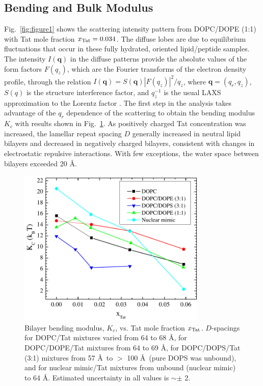 \subsection{Bending and Bulk Modulus}\label{sec:Kc_results}
Fig.~\ref{fig:figure1} shows the scattering intensity pattern from 
DOPC/DOPE (1:1) with Tat mole fraction $x_\textrm{Tat}=0.034$. The diffuse lobes are 
due to equilibrium fluctuations that occur in these fully hydrated, oriented 
lipid/peptide samples. The intensity $I(\mathbf{q})$ in the diffuse 
patterns provide the absolute values of the form factors $F(q_z)$, which are 
the Fourier transforms of the electron density 
profile, through the relation $I(\mathbf{q})=S(\mathbf{q})|F(q_z)|^2/q_z$, 
where $\mathbf{q}=(q_r,q_z)$, $S(q)$ is 
the structure
interference factor, and $q_z^{−1}$ is the usual LAXS approximation to the 
Lorentz factor \cite{Kucerka05_BPJ,Kucerka06,Kucerka05_JMB}.
The first step in the analysis takes advantage of the $q_r$ dependence of the 
scattering to obtain the
bending modulus $K_c$ with results shown in Fig.~\ref{fig:figure2}. 
As positively charged Tat concentration was increased, 
the lamellar repeat spacing $D$ generally increased in neutral lipid 
bilayers and decreased in negatively charged bilayers, consistent with changes in 
electrostatic repulsive interactions. 
With few exceptions, the water space between bilayers exceeded 20 \AA.

\begin{figure}[htbp]
  \centering
  \includegraphics[width=0.8\textwidth]{figures/Tat/NFIT_results/Kc}
  \caption{Bilayer bending modulus, $K_c$, vs. Tat mole fraction $x_\textrm{Tat}$. 
  $D$-spacings for DOPC/Tat mixtures varied from 64 to 68 \AA, 
  for DOPC/DOPE/Tat mixtures from 64 to 69 \AA, 
  for DOPC/DOPS/Tat (3:1) mixtures from 57 \AA\ to $>$ 100 \AA\ (pure DOPS was unbound), 
  and for nuclear mimic/Tat mixtures from unbound (nuclear mimic) to 64 \AA. 
  Estimated uncertainty in all values is  $\sim\pm$ 2.}
  \label{fig:figure2}
\end{figure}

